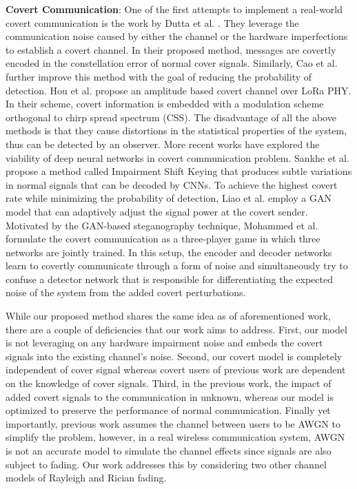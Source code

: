 \textbf{Covert Communication}: One of the first attempts to implement a real-world covert communication is the work by Dutta et al. \cite{dutta2012secret}. They leverage the communication noise caused by either the channel or the hardware imperfections to establish a covert channel. In their proposed method, messages are covertly encoded in the constellation error of normal cover signals. Similarly, Cao et al. \cite{cao2018wireless} further improve this method with the goal of reducing the probability of detection. Hou et al. \cite{hou2020cloaklora} propose an amplitude based covert channel over LoRa PHY. In their scheme, covert information is embedded with a modulation scheme orthogonal to chirp spread spectrum (CSS). The disadvantage of all the above methods is that they cause distortions in the statistical properties of the system, thus can be detected by an observer. More recent works have explored the viability of deep neural networks in covert communication problem. Sankhe et al. \cite{sankhe2019impairment} propose a method called Impairment Shift Keying that produces subtle variations in normal signals that can be decoded by CNNs. To achieve the highest covert rate while minimizing the probability of detection, Liao et al. \cite{liao2020generative} employ a GAN model that can adaptively adjust the signal power at the covert sender. Motivated by the GAN-based steganography technique, Mohammed et al. \cite{mohammed2021adversarial} formulate the covert communication as a three-player game in which three networks are jointly trained. In this setup, the encoder and decoder networks learn to covertly communicate through a form of noise and simultaneously try to confuse a detector network that is responsible for differentiating the expected noise of the system from the added covert perturbations. 


While our proposed method shares the same idea as of aforementioned work, there are a couple of deficiencies that our work aims to address. First, our model is not leveraging on any hardware impairment noise and embeds the covert signals into the existing channel's noise. Second, our covert model is completely independent of cover signal whereas covert users of previous work are dependent on the knowledge of cover signals. Third, in the previous work, the impact of added covert signals to the communication in unknown, whereas our model is optimized to preserve the performance of normal communication. Finally yet importantly, previous work assumes the channel between users to be AWGN to simplify the problem, however, in a real wireless communication system, AWGN is not an accurate model to simulate the channel effects since signals are also subject to fading. Our work addresses this by considering two other channel models of Rayleigh and Rician fading.